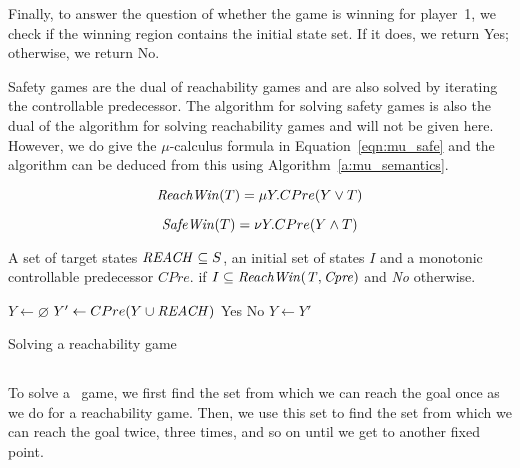 Finally, to answer the question of whether the game is winning for player~1, we check if the winning region contains the initial state set. If it does, we return Yes; otherwise, we return No.

Safety games are the dual of reachability games and are also solved by iterating the controllable predecessor. The algorithm for solving safety games is also the dual of the algorithm for solving reachability games and will not be given here. However, we do give the $\mu$-calculus formula in Equation~\ref{eqn:mu_safe} and the algorithm can be deduced from this using Algorithm~\ref{a:mu_semantics}.

\begin{equation}
    \mathit{ReachWin}(T) = \mu Y. CPre(Y \vee T)
\label{eqn:mu_reach}
\end{equation}

\begin{equation}
\mathit{SafeWin}(T) = \nu Y. CPre(Y \wedge T)
\label{eqn:mu_safe}
\end{equation}

\begin{algorithm}[t]
\begin{algorithmic}

\Require A set of target states $\mathit{REACH} \subseteq S$, an initial set of states $I$ and a monotonic controllable predecessor $CPre$.
 if $I \subseteq \mathit{ReachWin(T, Cpre)}$ and {\it No} otherwise.

    \State $Y \gets \varnothing$
    \Loop
        \State $Y' \gets CPre(Y \cup \mathit{REACH})$
                \State\Return Yes
            \Else
                \State\Return No
            \EndIf
        \EndIf
        \State $Y \gets Y'$
    \EndLoop
\EndFunction

\end{algorithmic}
\caption{Solving a reachability game}
\label{a:reach}
\end{algorithm}

\subsection{\buchi}

To solve a \buchi\ game, we first find the set from which we can reach the goal once as we do for a reachability game. Then, we use this set to find the set from which we can reach the goal twice, three times, and so on until we get to another fixed point. 

